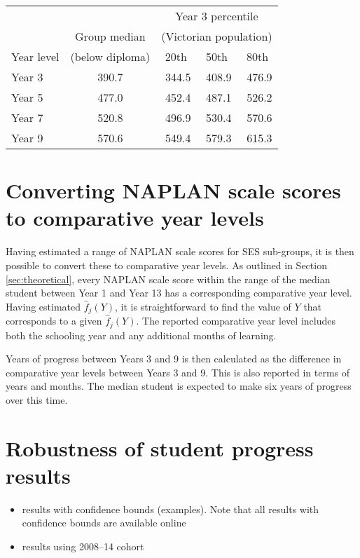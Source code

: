 \begin{table}[h]
  \centering

    \begin{tabular}{lcrrr}
          &       & \multicolumn{3}{c}{Year 3 percentile} \\

          & \multicolumn{1}{c}{Group median} & \multicolumn{3}{c}{(Victorian population)} \\     \cmidrule(lr){3-5}
    Year level & (below diploma) & \multicolumn{1}{c}{20th} & \multicolumn{1}{c}{50th} & \multicolumn{1}{c}{80th} \\ \midrule
    Year 3 & \multicolumn{1}{c}{390.7} & 344.5 & 408.9 & 476.9 \\
    Year 5 & \multicolumn{1}{c}{477.0} & 452.4 & 487.1 & 526.2 \\
    Year 7 & \multicolumn{1}{c}{520.8} & 496.9 & 530.4 & 570.6 \\
    Year 9 & \multicolumn{1}{c}{570.6} & 549.4 & 579.3 & 615.3 \\
    \bottomrule
    \end{tabular}%
  \label{tab:below_dip}%
\begin{flushleft}\end{flushleft}
\vspace{-6pt}
\end{table}%

\section{Converting NAPLAN scale scores to comparative year levels}

Having estimated a range of NAPLAN scale scores for SES sub-groups, it is then possible to convert these to comparative year levels. As outlined in Section \ref{sec:theoretical}, every NAPLAN scale score within the range of the median student between Year 1 and Year 13 has a corresponding comparative year level. Having estimated $\widehat{f}_{j}(Y)$, it is straightforward to find the value of $Y$ that corresponds to a given $\widehat{f}_{j}(Y)$. The reported comparative year level includes both the schooling year and any additional months of learning. 

Years of progress between Years 3 and 9 is then calculated as the difference in comparative year levels between Years 3 and 9. This is also reported in terms of years and months. The median student is expected to make six years of progress over this time.

\section{Robustness of student progress results} \label{sec:robust_progress}

\begin{itemize}
    \item results with confidence bounds (examples). Note that all results with confidence bounds are available online
    \item results using 2008--14 cohort
\end{itemize}